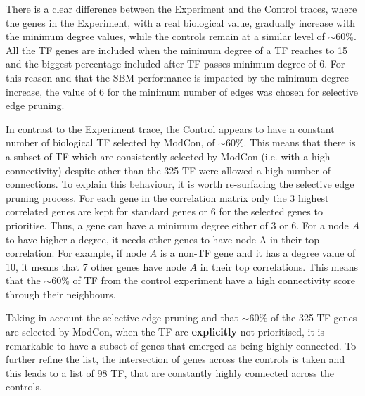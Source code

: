 There is a clear difference between the Experiment and the Control traces, where the genes in the Experiment, with a real biological value, gradually increase with the minimum degree values, while the controls remain at a similar level of $\sim60\%$. All the TF genes are included when the minimum degree of a TF reaches to 15 and the biggest percentage included after TF passes minimum degree of 6. For this reason and that the SBM performance is impacted by the minimum degree increase, the value of 6 for the minimum number of edges was chosen for selective edge pruning.


In contrast to the Experiment trace, the Control appears to have a constant number of biological TF selected by ModCon, of $\sim60$\%. This means that there is a subset of TF which are consistently selected by ModCon (i.e. with a high connectivity) despite other than the 325 TF were allowed a high number of connections. To explain this behaviour, it is worth re-surfacing the selective edge pruning process. For each gene in the correlation matrix only the 3 highest correlated genes are kept for standard genes or 6 for the selected genes to prioritise. Thus, a gene can have a minimum degree either of 3 or 6. For a node $A$ to have higher a degree, it needs other genes to have node A in their top correlation. For example, if node $A$ is a non-TF gene and it has a degree value of 10, it means that 7 other genes have node $A$ in their top correlations. This means that the  $\sim$60\% of TF from the control experiment have a high connectivity score through their neighbours.

Taking in account the selective edge pruning and that $\sim$60\% of the 325 TF genes are selected by ModCon, when the TF are \textbf{explicitly} not prioritised, it is remarkable to have a subset of genes that emerged as being highly connected. To further refine the list, the intersection of genes across the controls is taken and this leads to a list of 98 TF, that are constantly highly connected across the controls. 

